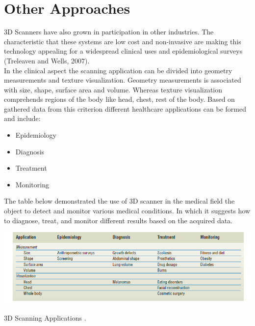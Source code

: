 \documentclass[a4paper]{article}
\begin{document}
 \section*{Other Approaches}
 3D Scanners have also grown in participation in other industries. The  characteristic that these systems are low cost and non-invasive are making this technology  appealing for a widespread clinical uses and epidemiological surveys (Treleaven and Wells, 2007).\\[10pt]
 In the clinical aspect the scanning application can be divided into geometry measurements and texture visualization. 
 Geometry measurements is associated with size, shape, surface area and volume. Whereas texture visualization comprehends regions of the body like head, chest, rest of the body.
 Based on gathered data from this criterion different healthcare applications can be formed and include: 
\begin{itemize}[]
    \itemsep0em 
    \item Epidemiology
    \item Diagnosis
    \item Treatment
    \item Monitoring
\end{itemize}
The table below demonstrated the use of 3D scanner in the medical field the object to detect and monitor various medical conditions. In which it suggests how to diagnose, treat, and monitor different results based on the acquired data.
\begin{table}[ht]
    \centering
    \includegraphics[width=17cm]{table1.png}
    \caption{3D Scanning Applications \cite[]{treleaven_wells_2007}.}
\end{table}
\end{document}
